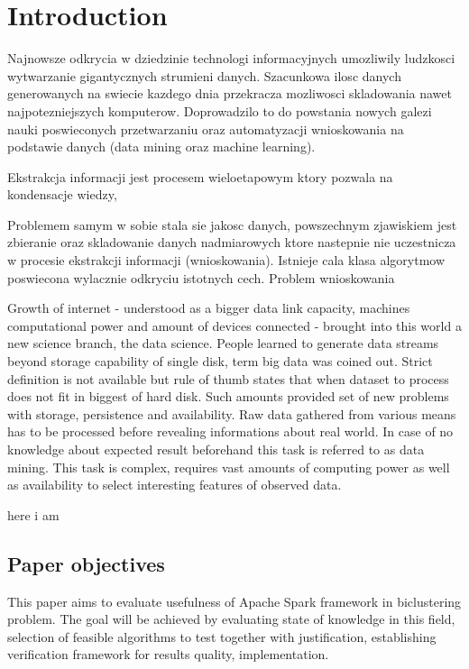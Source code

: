 \chapter{Introduction}
\label{cha:introduction}

Najnowsze odkrycia w dziedzinie technologi informacyjnych umozliwily ludzkosci wytwarzanie gigantycznych strumieni danych. Szacunkowa ilosc danych generowanych na swiecie kazdego dnia przekracza mozliwosci skladowania nawet najpotezniejszych komputerow. Doprowadzilo to do powstania nowych galezi nauki poswieconych przetwarzaniu oraz automatyzacji wnioskowania na podstawie danych (data mining oraz machine learning).

Ekstrakcja informacji jest procesem wieloetapowym ktory pozwala na kondensacje wiedzy, 

Problemem samym w sobie stala sie jakosc danych, powszechnym zjawiskiem jest zbieranie oraz skladowanie danych nadmiarowych ktore nastepnie nie uczestnicza w procesie ekstrakcji informacji (wnioskowania). Istnieje cala klasa algorytmow poswiecona wylacznie odkryciu istotnych cech.
Problem wnioskowania 

Growth of internet - understood as a bigger data link capacity, machines computational power and amount of devices connected - brought into this world a new science branch, the data science. People learned to generate data streams beyond storage capability of single disk, term big data was coined out. Strict definition is not available but rule of thumb states that when dataset to process does not fit in biggest of hard disk. Such amounts provided set of new problems with storage, persistence and availability.
Raw data gathered from various means has to be processed before revealing informations about real world. In case of no knowledge about expected result beforehand this task is referred to as data mining. This task is complex, requires vast amounts of computing power as well as availability to select interesting features of observed data. 


here i am\cite{madeiraoliveira2004}
\section{Paper objectives}
This paper aims to evaluate usefulness of Apache Spark framework in biclustering problem. The goal will be achieved by evaluating state of knowledge in this field, selection of feasible algorithms to test together with justification, establishing verification framework for results quality, implementation.

